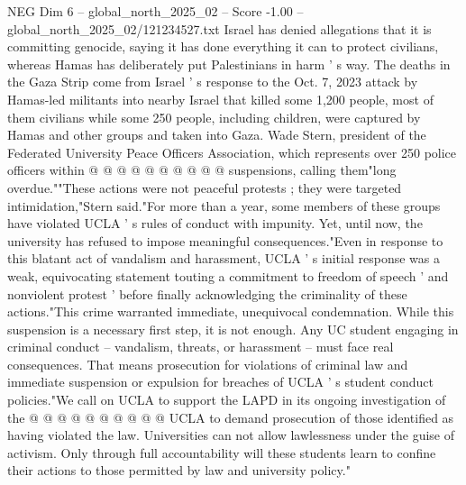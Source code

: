 \begin{textsample}{NEG Dim 6 – global\_north\_2025\_02 – Score -1.00 – global\_north\_2025\_02/121234527.txt}
Israel has denied allegations that it is committing genocide, saying it has done everything it can to protect civilians, whereas Hamas has deliberately put Palestinians in harm ' s way.
The deaths in the Gaza Strip come from Israel ' s response to the Oct. 7, 2023 attack by Hamas-led militants into nearby Israel that killed some 1,200 people, most of them civilians while some 250 people, including children, were captured by Hamas and other groups and taken into Gaza.
Wade Stern, president of the Federated University Peace Officers Association, which represents over 250 police officers within @ @ @ @ @ @ @ @ @ @ suspensions, calling them"long overdue.""These actions were not peaceful protests ; they were targeted intimidation,"Stern said."For more than a year, some members of these groups have violated UCLA ' s rules of conduct with impunity.
Yet, until now, the university has refused to impose meaningful consequences."Even in response to this blatant act of vandalism and harassment, UCLA ' s initial response was a weak, equivocating statement touting a commitment to freedom of speech ' and nonviolent protest ' before finally acknowledging the criminality of these actions."This crime warranted immediate, unequivocal condemnation.
While this suspension is a necessary first step, it is not enough.
Any UC student engaging in criminal conduct -- vandalism, threats, or harassment -- must face real consequences.
That means prosecution for violations of criminal law and immediate suspension or expulsion for breaches of UCLA ' s student conduct policies."We call on UCLA to support the LAPD in its ongoing investigation of the @ @ @ @ @ @ @ @ @ @ UCLA to demand prosecution of those identified as having violated the law.
Universities can not allow lawlessness under the guise of activism.
Only through full accountability will these students learn to confine their actions to those permitted by law and university policy."

\end{textsample}
